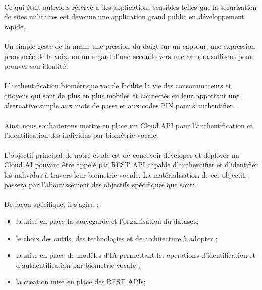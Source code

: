 \paragraph{}Ce qui était autrefois réservé à des applications sensibles telles que la sécurisation de sites militaires est devenue une application grand public en développement rapide.
\paragraph{}Un simple geste de la main, une pression du doigt sur un capteur, une expression prononcée de la voix, ou un regard d’une seconde vers une caméra suffisent pour prouver son identité.
\paragraph{}L’authentification biométrique vocale facilite la vie des consommateurs et citoyens qui sont de plus en plus mobiles et connectés en leur apportant une alternative simple aux mots de passe et aux codes PIN pour s’authentifier. 
\paragraph{}Ainsi nous souhaiterons mettre en place un Cloud API pour l’authentification et l’identification des individus par biométrie vocale.

\paragraph{}L’objectif principal de notre étude est de concevoir déveloper et déployer un Cloud AI pouvant être appelé par REST API capable d’authentifier et d’identifier les individus à travers leur biometrie vocale. La matérialisation de cet objectif, passera par l’aboutissement des objectifs spécifiques que sont: 

\paragraph{}De façon spécifique, il s’agira :
\begin{itemize}
    \item la mise  en place la sauvegarde et l’organisation du dataset; 
    \item le choix des outils, des technologies  et de architecture à adopter ; 
    \item la mise en place de modèles d'IA  permettant les operations d’identification et d’authentification par biometrie vocale ; 
    \item la création mise en place des REST APIs;
\end{itemize}

